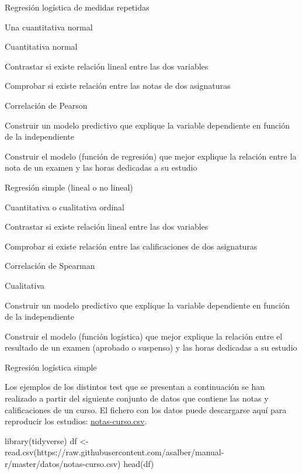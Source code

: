 \documentclass[
  a4paper,
]{scrreport}
\newenvironment{Shaded}{\begin{snugshade}}{\end{snugshade}}
\newcommand{\FunctionTok}[1]{\textcolor[rgb]{0.28,0.35,0.67}{#1}}
\newcommand{\NormalTok}[1]{\textcolor[rgb]{0.00,0.23,0.31}{#1}}
\newcommand{\OtherTok}[1]{\textcolor[rgb]{0.00,0.23,0.31}{#1}}
\newcommand{\StringTok}[1]{\textcolor[rgb]{0.13,0.47,0.30}{#1}}
\theoremstyle{definition}
\theoremstyle{definition}
\theoremstyle{remark}
\begin{document}
Regresión logística de medidas repetidas

Una cuantitativa normal

Cuantitativa normal

Contrastar si existe relación lineal entre las dos variables

Comprobar si existe relación entre las notas de dos asignaturas

Correlación de Pearson

Construir un modelo predictivo que explique la variable dependiente en
función de la independiente

Construir el modelo (función de regresión) que mejor explique la
relación entre la nota de un examen y las horas dedicadas a su estudio

Regresión simple (lineal o no lineal)

Cuantitativa o cualitativa ordinal

Contrastar si existe relación lineal entre las dos variables

Comprobar si existe relación entre las calificaciones de dos asignaturas

Correlación de Spearman

Cualitativa

Construir un modelo predictivo que explique la variable dependiente en
función de la independiente

Construir el modelo (función logística) que mejor explique la relación
entre el resultado de un examen (aprobado o suspenso) y las horas
dedicadas a su estudio

Regresión logística simple

Los ejemplos de los distintos test que se presentan a continuación se
han realizado a partir del siguiente conjunto de datos que contiene las
notas y calificaciones de un curso. El fichero con los datos puede
descargarse aquí para reproducir los estudios:
\href{https://raw.githubusercontent.com/asalber/manual-r/master/datos/notas-curso.csv}{notas-curso.csv}.

\begin{Shaded}
\begin{Highlighting}[]
\FunctionTok{library}\NormalTok{(tidyverse)}
\NormalTok{df }\OtherTok{\textless{}{-}} \FunctionTok{read.csv}\NormalTok{(}\StringTok{\textquotesingle{}https://raw.githubusercontent.com/asalber/manual{-}r/master/datos/notas{-}curso.csv\textquotesingle{}}\NormalTok{)}
\FunctionTok{head}\NormalTok{(df)}
\end{Highlighting}
\end{Shaded}
\end{document}
